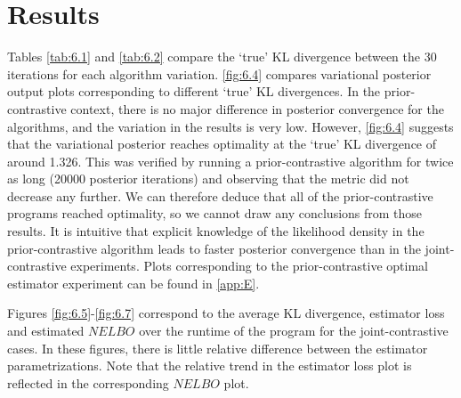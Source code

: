 \documentclass[honours,12pt, twoside]{unswthesis}
\numberwithin{equation}{section}
\theoremstyle{definition}
\begin{document}
\section{Results}
Tables \ref{tab:6.1} and \ref{tab:6.2} compare the `true' KL divergence between the 30 iterations for each algorithm variation. \autoref{fig:6.4} compares variational posterior output plots corresponding to different `true' KL divergences. In the prior-contrastive context, there is no major difference in posterior convergence for the algorithms, and the variation in the results is very low. However, \autoref{fig:6.4} suggests that the variational posterior reaches optimality at the `true' KL divergence of around 1.326. This was verified by running a prior-contrastive algorithm for twice as long (20000 posterior iterations) and observing that the metric did not decrease any further. We can therefore deduce that all of the prior-contrastive programs reached optimality, so we cannot draw any conclusions from those results. It is intuitive that explicit knowledge of the likelihood density in the prior-contrastive algorithm leads to faster posterior convergence than in the joint-contrastive experiments. Plots corresponding to the prior-contrastive optimal estimator experiment can be found in \autoref{app:E}.

Figures \ref{fig:6.5}-\ref{fig:6.7} correspond to the average KL divergence, estimator loss and estimated $NELBO$ over the runtime of the program for the joint-contrastive cases. In these figures, there is little relative difference between the estimator parametrizations. Note that the relative trend in the estimator loss plot is reflected in the corresponding $NELBO$ plot.
\end{document}
